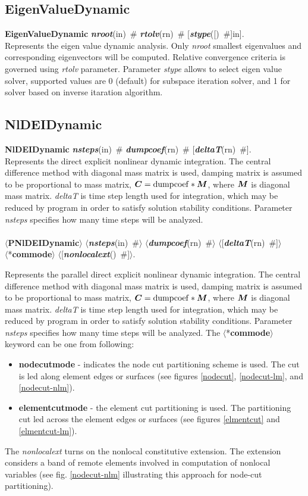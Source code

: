 \documentclass[draft]{article}
\newcommand{\mbf}[1]{\mbox{\boldmath$#1$}}
\newcommand{\param}[1]{{\em #1}}
\newcommand{\keywordnotype}[1]{\mbox{{\it{\bf{#1}}}}}
\newcommand{\keyword}[2]{\mbox{{\keywordnotype{#1}\tiny (#2)}}}
\newcommand{\entKeywordInst}[1]{\mbox{{\bf{{#1}}}}}
\newcommand{\field}[2]{\mbox{\keyword{#1}{#2}~\#}}
\newcommand{\optField}[2]{\mbox{[\field{#1}{#2}]}}
\newcommand{\Pmode}[1]{{\sffamily #1}}
\newcommand{\PentKeyword}[1]{\mbox{{$\langle$*{\bf{#1}}$\rangle$}}}
\newcommand{\PentKeywordInst}[1]{\mbox{$\langle${\bf{{#1}}}$\rangle$}}
\newcommand{\Pfield}[2]{\mbox{$\langle$\keyword{#1}{#2}~\#$\rangle$}}
\newcommand{\PoptField}[2]{\mbox{$\langle$[\field{#1}{#2}]$\rangle$}}
\begin{document}
\subsection{EigenValueDynamic}
\label{EigenValueDynamic}
\entKeywordInst{EigenValueDynamic} \field{nroot}{in}
\field{rtolv}{rn} \optField{stype}[in].\\
Represents the eigen value dynamic analysis.
Only \param{nroot} smallest eigenvalues and corresponding
eigenvectors will be computed. Relative convergence criteria is
governed using \param{rtolv} parameter.
Parameter \param{stype} allows to select eigen value solver, supported
values are 0 (default) for subspace iteration solver, and 1 for solver
based on inverse itaration algorithm.

\subsection{NlDEIDynamic}
\label{NlDEIDynamic}
\entKeywordInst{NlDEIDynamic} \field{nsteps}{in}
\field{dumpcoef}{rn} \optField{deltaT}{rn}.\\
Represents the direct explicit  nonlinear dynamic  integration.
The central difference method with diagonal mass matrix is used,
damping matrix is assumed to be proportional to mass matrix, $\mbf{C}
= {\rm dumpcoef} * \mbf{M}$, where
$\mbf{M}$ is diagonal mass matrix. \param{deltaT} is time step length used for
integration, which may be reduced by program in order to satisfy
solution stability conditions. Parameter \param{nsteps} specifies
how many time steps will be analyzed.
\\ \\
\noindent
\PentKeywordInst{PNlDEIDynamic} \Pfield{nsteps}{in}
\Pfield{dumpcoef}{rn} \PoptField{deltaT}{rn} \\\PentKeyword{commode} \PoptField{nonlocalext}{}.\\
\Pmode{
Represents the parallel direct explicit  nonlinear dynamic  integration.
The central difference method with diagonal mass matrix is used,
damping matrix is assumed to be proportional to mass matrix, $\mbf{C}
= {\rm dumpcoef} * \mbf{M}$, where
$\mbf{M}$ is diagonal mass matrix. \param{deltaT} is time step length used for
integration, which may be reduced by program in order to satisfy
solution stability conditions. Parameter \param{nsteps} specifies
how many time steps will be analyzed.
The \PentKeyword{commode} keyword can be one from following:
\begin{itemize}
\item \entKeywordInst{nodecutmode} - indicates the node cut partitioning scheme is
used. The cut is led along element edges or surfaces (see
figures \ref{nodecut}, \ref{nodecut-lm}, and \ref{nodecut-nlm}).
\item \entKeywordInst{elementcutmode} - the element cut partitioning is used. The
partitioning cut led across the element edges or surfaces (see 
figures \ref{elmentcut} and \ref{elmentcut-lm}).
\end{itemize}
The \param{nonlocalext} turns on the nonlocal constitutive
extension. The extension considers a band of remote elements involved
in computation of nonlocal variables (see fig. \ref{nodecut-nlm} illustrating
this approach for node-cut partitioning).
}
\end{document}
